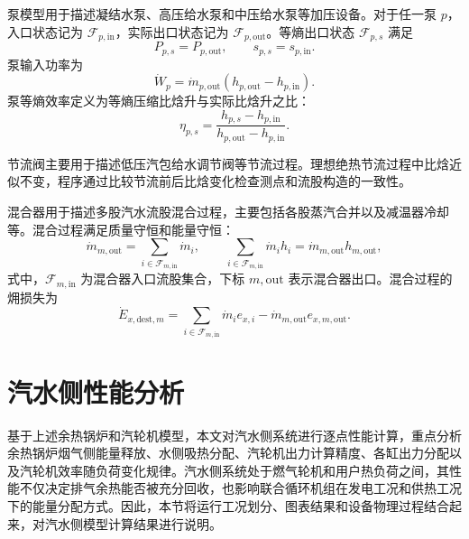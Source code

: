 泵模型用于描述凝结水泵、高压给水泵和中压给水泵等加压设备。对于任一泵 $p$，入口状态记为 $\mathcal{F}_{p,\mathrm{in}}$，实际出口状态记为 $\mathcal{F}_{p,\mathrm{out}}$。等熵出口状态 $\mathcal{F}_{p,s}$ 满足
\begin{equation}\label{eq:pump-isentropic-state}
P_{p,s}=P_{p,\mathrm{out}},
\qquad
s_{p,s}=s_{p,\mathrm{in}}.
\end{equation}
泵输入功率为
\begin{equation}\label{eq:pump-power}
\dot{W}_{p}
=
\dot{m}_{p,\mathrm{out}}
\left(
h_{p,\mathrm{out}}
-
h_{p,\mathrm{in}}
\right).
\end{equation}
泵等熵效率定义为等熵压缩比焓升与实际比焓升之比：
\begin{equation}\label{eq:pump-isentropic-eff}
\eta_{p,s}
=
\frac{
h_{p,s}-h_{p,\mathrm{in}}
}{
h_{p,\mathrm{out}}-h_{p,\mathrm{in}}
}.
\end{equation}

节流阀主要用于描述低压汽包给水调节阀等节流过程。理想绝热节流过程中比焓近似不变，程序通过比较节流前后比焓变化检查测点和流股构造的一致性。

混合器用于描述多股汽水流股混合过程，主要包括各股蒸汽合并以及减温器冷却等。混合过程满足质量守恒和能量守恒：
\begin{equation}\label{eq:mixer-balance}
\dot{m}_{m,\mathrm{out}}
=
\sum_{i\in\mathcal{F}_{m,\mathrm{in}}}
\dot{m}_i,
\qquad
\sum_{i\in\mathcal{F}_{m,\mathrm{in}}}
\dot{m}_i h_i
=
\dot{m}_{m,\mathrm{out}}h_{m,\mathrm{out}},
\end{equation}
式中，$\mathcal{F}_{m,\mathrm{in}}$ 为混合器入口流股集合，下标 $m,\mathrm{out}$ 表示混合器出口。混合过程的㶲损失为
\begin{equation}\label{eq:mixer-exergy-loss}
\dot{E}_{x,\mathrm{dest},m}
=
\sum_{i\in\mathcal{F}_{m,\mathrm{in}}}
\dot{m}_i e_{x,i}
-
\dot{m}_{m,\mathrm{out}}e_{x,m,\mathrm{out}}.
\end{equation}

\section{汽水侧性能分析}

基于上述余热锅炉和汽轮机模型，本文对汽水侧系统进行逐点性能计算，重点分析余热锅炉烟气侧能量释放、水侧吸热分配、汽轮机出力计算精度、各缸出力分配以及汽轮机效率随负荷变化规律。汽水侧系统处于燃气轮机和用户热负荷之间，其性能不仅决定排气余热能否被充分回收，也影响联合循环机组在发电工况和供热工况下的能量分配方式。因此，本节将运行工况划分、图表结果和设备物理过程结合起来，对汽水侧模型计算结果进行说明。

